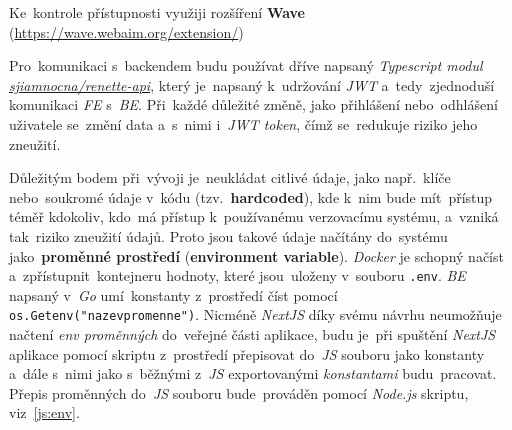 \documentclass[11pt,a4paper]{report}
\let\oldacrshort\acrshort
\renewcommand{\acrshort}[1]{\emph{\normalsize\color[rgb]{0,0,0}\noindent\oldacrshort{#1}}}
\begin{document}
            Ke~kontrole přístupnosti využiji rozšíření \textbf{Wave} (\url{https://wave.webaim.org/extension/})

            Pro~komunikaci s~backendem budu používat dříve napsaný \emph{Typescript modul} \href{https://gitlab.com/sjiamnocna/renette-api}{\emph{sjiamnocna/renette-api}}, který je~napsaný k~udržování \acrshort{JWT} a~tedy~zjednoduší komunikaci \acrshort{FE} s~\acrshort{BE}. Při~každé důležité změně, jako přihlášení nebo~odhlášení uživatele se~změní data a~s~nimi i~\emph{JWT token}, čímž se~redukuje riziko jeho zneužití.

            Důležitým bodem při~vývoji je~neukládat citlivé údaje, jako např.~klíče nebo~soukromé údaje v~kódu (tzv.~\textbf{hardcoded}), kde k~nim bude mít~přístup téměř kdokoliv, kdo~má přístup k~používanému verzovacímu systému, a~vzniká tak~riziko zneužití údajů. Proto jsou takové údaje načítány do~systému jako~\textbf{proměnné prostředí} (\textbf{environment variable}). \emph{Docker} je schopný načíst a~zpřístupnit~kontejneru hodnoty, které jsou~uloženy v~souboru \texttt{.env}. \acrshort{BE} napsaný v~\emph{Go} umí~konstanty z~prostředí číst pomocí \texttt{os.Getenv("nazevpromenne")}. Nicméně \emph{NextJS} díky svému návrhu neumožňuje načtení \emph{env proměnných} do~veřejné části aplikace, budu je~při spuštění \emph{NextJS} aplikace pomocí skriptu z~prostředí přepisovat do~\acrshort{JS} souboru jako konstanty a~dále s~nimi jako s~běžnými z~\acrshort{JS} exportovanými \emph{konstantami} budu~pracovat. Přepis proměnných do~\acrshort{JS} souboru bude~prováděn pomocí \emph{Node.js} skriptu, viz~\ref{js:env}.
            
\end{document}
